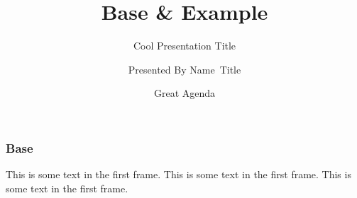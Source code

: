 \documentclass{beamer}
\title[\url{https://google.com}] %
{Base \& Example}
\subtitle{Cool Presentation Title}
\author[VIP1 \& VIP2] %
{Presented By Name~Title\inst{1}}
\institute[IDK] %
{
	\inst{1}%
	Large Team\\
	Huge Organization
}
\date[01/03/2022] %
{Great Agenda}
\begin{document}
\frame{\titlepage}

\begin{frame}
	\frametitle{Base}
	This is some text in the first frame. This is some text in the first frame. This is some text in the first frame.
\end{frame}
\end{document}

